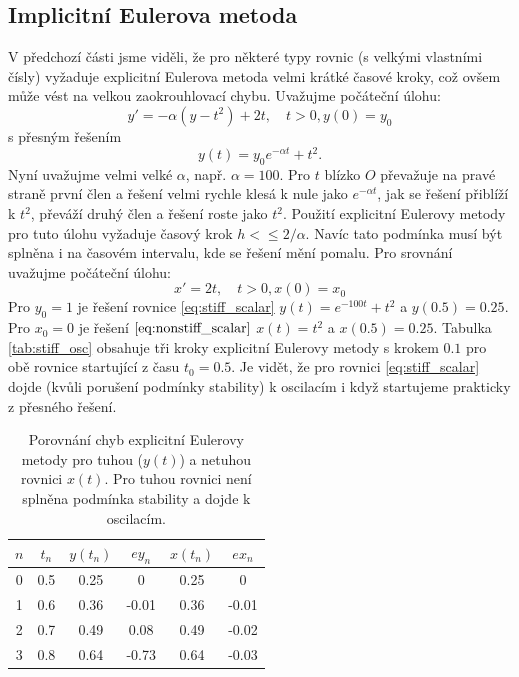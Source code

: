 \documentclass[a4paper, 12pt]{book}
\theoremstyle{definition}
\begin{document}
\subsection{Implicitní Eulerova metoda}
V předchozí části jsme viděli, že pro některé typy rovnic (s velkými vlastními čísly) vyžaduje explicitní Eulerova metoda 
velmi krátké časové kroky, což ovšem může vést na velkou zaokrouhlovací chybu. Uvažujme počáteční úlohu:
\begin{equation}
  \label{eq:stiff_scalar}
  y' = -\alpha (y-t^2) +2t,\quad t>0, y(0)=y_0
\end{equation}
s přesným řešením
\[
    y(t)=y_0e^{-\alpha t} + t^2.
\]
Nyní uvažujme velmi velké $\alpha$, např. $\alpha=100$. Pro $t$ blízko $O$ převažuje na pravé straně první člen a řešení 
velmi rychle klesá k nule jako $e^{-\alpha t}$, jak se řešení přiblíží k $t^2$, převáží druhý člen a řešení roste jako $t^2$.
Použití explicitní Eulerovy metody pro tuto úlohu vyžaduje časový krok $h<\le 2/\alpha$. Navíc tato podmínka musí být splněna
i na časovém intervalu, kde se řešení mění pomalu. Pro srovnání uvažujme počáteční úlohu:
\begin{equation}
    \label{eq:nonstiff_scalar}
    x' = 2t, \quad t>0, x(0)=x_0
\end{equation}
Pro $y_0=1$ je řešení rovnice \eqref{eq:stiff_scalar} $y(t) = e^{-100t} +t^2$ a $y(0.5) = 0.25$. Pro $x_0=0$ je řešení $\eqref{eq:nonstiff_scalar}$
$x(t)=t^2$ a $x(0.5)=0.25$. Tabulka \ref{tab:stiff_osc} obsahuje tři kroky explicitní Eulerovy metody s krokem $0.1$ pro obě rovnice startující z času $t_0=0.5$.
Je vidět, že pro rovnici \eqref{eq:stiff_scalar} dojde (kvůli porušení podmínky stability) k oscilacím i když startujeme prakticky z přesného řešení.

\begin{table}[h]
\label{tab:stiff_osc}
\centering
\begin{tabular}{|c|c|c|c|c|c|}
\hline
$n$ & $t_n$ & $y(t_n)$ & $ey_n$ & $x(t_n)$ & $ex_n$\\ 
\hline
0 & 0.5 & 0.25 & 0 & 0.25 & 0\\ 
\hline
1 & 0.6 & 0.36 & -0.01 & 0.36 & -0.01\\ 
\hline
2 & 0.7 & 0.49 & 0.08 & 0.49  & -0.02 \\
\hline
3 & 0.8 & 0.64 & -0.73  & 0.64  & -0.03\\
\hline\end{tabular}
\label{table:instability}
\caption{Porovnání chyb explicitní Eulerovy metody pro tuhou ($y(t)$) a netuhou rovnici $x(t)$. 
Pro tuhou rovnici není splněna podmínka stability a dojde k oscilacím.} 
\end{table}
\end{document}
